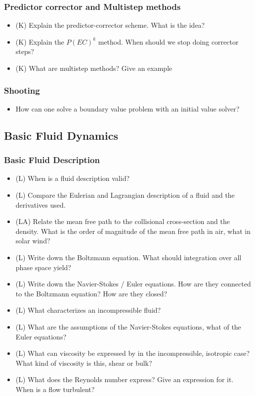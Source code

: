 \subsubsection*{Predictor corrector and Multistep methods}
\begin{itemize}
    \item (K) Explain the predictor-corrector scheme. What is the idea?
    \answerboxM
    \item (K) Explain the $P(EC)^k$ method. When should we stop doing corrector steps?
    \answerboxM
    \item (K) What are multistep methods? Give an example
    \answerboxM
\end{itemize}

\subsubsection*{Shooting}
\begin{itemize}
    \item How can one solve a boundary value problem with an initial value solver?
    \answerboxM
\end{itemize}

\subsection*{Basic Fluid Dynamics}

\subsubsection*{Basic Fluid Description}
\begin{itemize}
    \item (L) When is a fluid description valid?
    \answerboxS
    \item (L) Compare the Eulerian and Lagrangian description of a fluid and the derivatives used.
    \answerboxM
    \item (LA) Relate the mean free path to the collisional cross-section and the density. What is the order of
    magnitude of the mean free path in air, what in solar wind?
    \answerboxM
    \item (L) Write down the Boltzmann equation. What should integration over all phase space yield?
    \answerboxS
    \item (L) Write down the Navier-Stokes / Euler equations. How are they connected to the Boltzmann equation? How are they closed?
    \answerboxL
    \item (L) What characterizes an incompressible fluid?
    \answerboxM
    \item (L) What are the assumptions of the Navier-Stokes equations, what of the Euler equations?
    \answerboxM
    \item (L) What can viscosity be expressed by in the incompressible, isotropic case? What kind of viscosity is this, shear or bulk?
    \answerboxM
    \item (L) What does the Reynolds number express? Give an expression for it. When is a flow turbulent?
    \answerboxM
\end{itemize}

